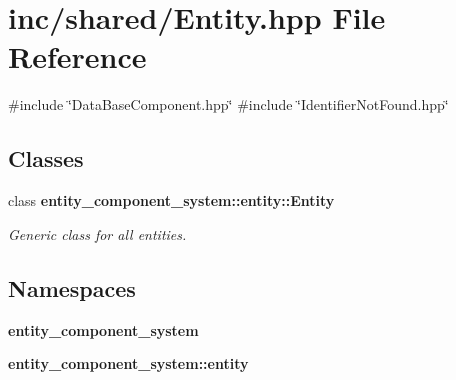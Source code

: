 \section{inc/shared/\+Entity.hpp File Reference}
\label{_entity_8hpp}
{\ttfamily \#include \char`\"{}Data\+Base\+Component.\+hpp\char`\"{}}\newline
{\ttfamily \#include \char`\"{}Identifier\+Not\+Found.\+hpp\char`\"{}}\newline
\subsection*{Classes}
\begin{DoxyCompactItemize}
\item 
class {\bf entity\+\_\+component\+\_\+system\+::entity\+::\+Entity}
\begin{DoxyCompactList}\small\item\em Generic class for all entities. \end{DoxyCompactList}\end{DoxyCompactItemize}
\subsection*{Namespaces}
\begin{DoxyCompactItemize}
\item 
 {\bf entity\+\_\+component\+\_\+system}
\item 
 {\bf entity\+\_\+component\+\_\+system\+::entity}
\end{DoxyCompactItemize}
